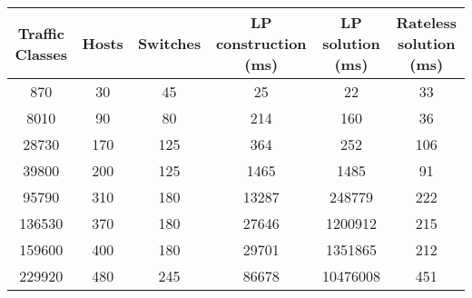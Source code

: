 \begin{tabular}[h]{|c|c|c|c|c|c|}
\hline
\textbf{Traffic Classes} & 
\textbf{Hosts} & 
\textbf{Switches} & 
\textbf{LP construction (ms)} & 
\textbf{LP solution (ms)} & 
\textbf{Rateless solution (ms)}\\
\hline
870 & 30 & 45 & 25 & 22 & 33 \\
8010 & 90 & 80 & 214 & 160 & 36 \\
28730 & 170 & 125 & 364 & 252 & 106 \\
39800 & 200 & 125 & 1465 & 1485 & 91 \\
95790 & 310 & 180 & 13287 & 248779 & 222 \\
136530 & 370 & 180 & 27646 & 1200912 & 215 \\
159600 & 400 & 180 & 29701 & 1351865 & 212 \\
229920 & 480 & 245 & 86678 & 10476008 & 451\\
\hline
\end{tabular}
